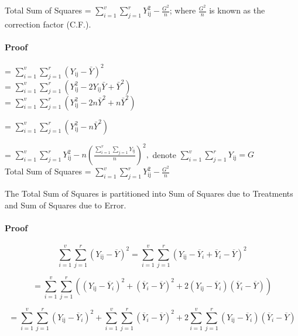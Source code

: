 \documentclass[
]{book}
\begin{document}
Total Sum of Squares = \(\sum_{i = 1}^{v}\sum_{j = 1}^{r} Y_{\text{ij}}^{2} - \frac{G^{2}}{n}\); where
\(\frac{G^{2}}{n}\) is known as the correction factor (C.F.).

\hypertarget{proof}{%
\paragraph{Proof}\label{proof}}

= \(\sum_{i = 1}^{v}\sum_{j = 1}^{r}\left( Y_{\text{ij}} - \bar{Y} \right)^{2}\)\\
= \(\sum_{i = 1}^{v}\sum_{j = 1}^{r}\left( Y_{\text{ij}}^{2} - 2Y_{\text{ij}}\bar{Y} + {\bar{Y}}^{2} \right)\)\\
= \(\sum_{i = 1}^{v}\sum_{j = 1}^{r}\left( Y_{\text{ij}}^{2} - 2n{\bar{Y}}^{2} + n{\bar{Y}}^{2} \right)\)

= \(\sum_{i = 1}^{v}\sum_{j = 1}^{r}\left( Y_{\text{ij}}^{2} - n{\bar{Y}}^{2} \right)\)

= \(\sum_{i = 1}^{v}\sum_{j = 1}^{r} Y_{\text{ij}}^{2} - n\left( \frac{\sum_{i = 1}^{v}\sum_{j = 1} Y_{\text{ij}}}{n} \right)^{2},\)
denote \(\sum_{i = 1}^{v}\sum_{j = 1}^{r} Y_{\text{ij}} = G\)\\
Total Sum of Squares = \(\sum_{i = 1}^{v}\sum_{j = 1}^{r} Y_{\text{ij}}^{2} - \frac{G^{2}}{n}\)

The Total Sum of Squares is partitioned into Sum of Squares due to Treatments and Sum of Squares due to Error.

\hypertarget{proof-1}{%
\paragraph{Proof}\label{proof-1}}

\[\sum_{i = 1}^{v}{\sum_{j = 1}^{r}\left( Y_{\text{ij}} - \overline{Y} \right)^{2}} = \sum_{i = 1}^{v}{\sum_{j = 1}^{r}\left( Y_{\text{ij}} - {\overline{Y}}_{i} + {\overline{Y}}_{i} - \overline{Y} \right)^{2}}\]

\[= \sum_{i = 1}^{v}{\sum_{j = 1}^{r}\left( \left( Y_{\text{ij}} - {\overline{Y}}_{i} \right)^{2} + \left( {\overline{Y}}_{i} - \overline{Y} \right)^{2} + 2\left( Y_{\text{ij}} - {\overline{Y}}_{i} \right)\left( {\overline{Y}}_{i} - \overline{Y} \right) \right)}\]

\[= \sum_{i = 1}^{v}{\sum_{j = 1}^{r}{\left( Y_{\text{ij}} - {\overline{Y}}_{i} \right)^{2} +}}\sum_{i = 1}^{v}{\sum_{j = 1}^{r}{\left( {\overline{Y}}_{i} - \overline{Y} \right)^{2} + 2\sum_{i = 1}^{v}{\sum_{j = 1}^{r}{\left( Y_{\text{ij}} - {\overline{Y}}_{i} \right)\left( {\overline{Y}}_{i} - \overline{Y} \right)}}}}\]
\end{document}

